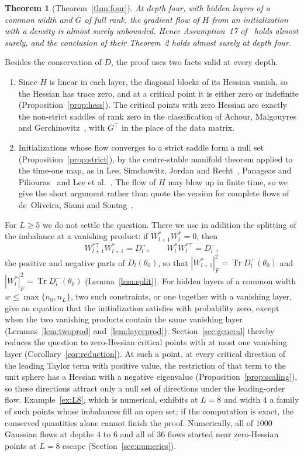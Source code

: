 \documentclass[11pt]{amsart}
\newtheorem*{mainthm}{Theorem}
\theoremstyle{definition}
\theoremstyle{remark}
\numberwithin{equation}{section}
\DeclareMathOperator{\Tr}{Tr}
\begin{document}
\begin{mainthm}[Theorem~\ref{thm:four}]
At depth four, with hidden layers of a common width and $G$ of full rank, the gradient flow of $H$ from an initialization with a density is almost surely unbounded. Hence Assumption~17 of~\cite{JGSHG} holds almost surely, and the conclusion of their Theorem~2 holds almost surely at depth four.
\end{mainthm}

Besides the conservation of $D$, the proof uses two facts valid at every depth.
\begin{enumerate}[label=(\roman*)]
\item Since $H$ is linear in each layer, the diagonal blocks of its Hessian vanish, so the Hessian has trace zero, and at a critical point it is either zero or indefinite (Proposition~\ref{prop:hess}). The critical points with zero Hessian are exactly the non-strict saddles of rank zero in the classification of Achour, Malgouyres and Gerchinovitz~\cite{AMG}, with $G^\top$ in the place of the data matrix.
\item Initializations whose flow converges to a strict saddle form a null set (Proposition~\ref{prop:strict}), by the centre-stable manifold theorem applied to the time-one map, as in Lee, Simchowitz, Jordan and Recht~\cite{LSJR}, Panageas and Piliouras~\cite{PP} and Lee et al.~\cite{LPPSJR}. The flow of $H$ may blow up in finite time, so we give the short argument rather than quote the version for complete flows of de~Oliveira, Siami and Sontag~\cite{OSS}.
\end{enumerate}

For $L\ge5$ we do not settle the question. There we use in addition the splitting of the imbalance at a vanishing product: if $W^*_{l+1}W^*_l=0$, then
\[
W_{l+1}^{*\top}W^*_{l+1}=D_l^+,\qquad W^*_lW_l^{*\top}=D_l^-,
\]
the positive and negative parts of $D_l(\theta_0)$, so that $|W^*_{l+1}|_F^2=\Tr D_l^+(\theta_0)$ and $|W^*_l|_F^2=\Tr D_l^-(\theta_0)$ (Lemma~\ref{lem:split}). For hidden layers of a common width $w\le\max\{n_0,n_L\}$, two such constraints, or one together with a vanishing layer, give an equation that the initialization satisfies with probability zero, except when the two vanishing products contain the same vanishing layer (Lemmas~\ref{lem:twoprod} and~\ref{lem:layerprod}). Section~\ref{sec:general} thereby reduces the question to zero-Hessian critical points with at most one vanishing layer (Corollary~\ref{cor:reduction}). At such a point, at every critical direction of the leading Taylor term with positive value, the restriction of that term to the unit sphere has a Hessian with a negative eigenvalue (Proposition~\ref{prop:scaling}), so these directions attract only a null set of directions under the leading-order flow. Example~\ref{ex:L8}, which is numerical, exhibits at $L=8$ and width $4$ a family of such points whose imbalances fill an open set; if the computation is exact, the conserved quantities alone cannot finish the proof. Numerically, all of $1000$ Gaussian flows at depths $4$ to $6$ and all of $36$ flows started near zero-Hessian points at $L=8$ escape (Section~\ref{sec:numerics}).
\end{document}
